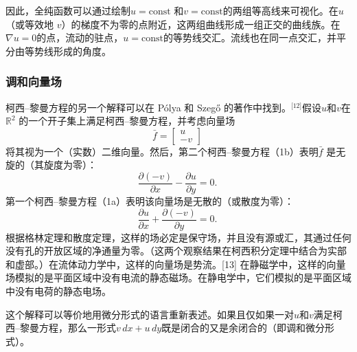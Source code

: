因此，全纯函数可以通过绘制\( u = \text{const} \) 和\( v = \text{const} \)的两组等高线来可视化。在\( u \)（或等效地 \( v \)）的梯度不为零的点附近，这两组曲线形成一组正交的曲线族。在\( \nabla u = 0 \)的点，流动的驻点，\( u = \text{const} \)的等势线交汇。流线也在同一点交汇，并平分由等势线形成的角度。
\subsubsection{调和向量场}
柯西–黎曼方程的另一个解释可以在 Pólya 和 Szegő 的著作中找到。\(^\text{[12]}\)假设\( u \)和\( v \)在\(\mathbb{R}^2 \) 的一个开子集上满足柯西–黎曼方程，并考虑向量场  
\[
\bar{f} = \begin{bmatrix} u \\ -v \end{bmatrix}~
\]
将其视为一个（实数）二维向量。然后，第二个柯西–黎曼方程（1b）表明\( \bar{f} \) 是无旋的（其旋度为零）：  
\[
\frac{\partial (-v)}{\partial x} - \frac{\partial u}{\partial y} = 0.~
\]
第一个柯西–黎曼方程（1a）表明该向量场是无散的（或散度为零）：  
\[
\frac{\partial u}{\partial x} + \frac{\partial (-v)}{\partial y} = 0.~
\]
根据格林定理和散度定理，这样的场必定是保守场，并且没有源或汇，其通过任何没有孔的开放区域的净通量为零。（这两个观察结果在柯西积分定理中结合为实部和虚部。）在流体动力学中，这样的向量场是势流。[13] 在静磁学中，这样的向量场模拟的是平面区域中没有电流的静态磁场。在静电学中，它们模拟的是平面区域中没有电荷的静态电场。

这个解释可以等价地用微分形式的语言重新表述。如果且仅如果一对\( u \)和\( v \)满足柯西–黎曼方程，那么一形式\(v\,dx + u\,dy\)既是闭合的又是余闭合的（即调和微分形式）。